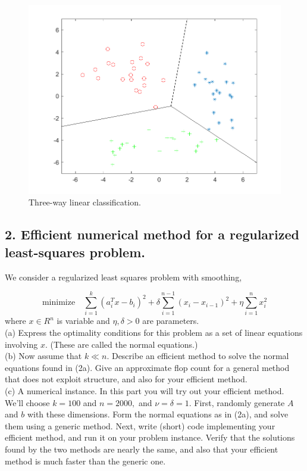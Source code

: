 \documentclass{article}
\begin{document}
\begin{figure}[H]
	\includegraphics[width=\linewidth]
	{additional_1_fig_1.png}
	\caption{Three-way linear classification.}
\end{figure}


\subsection*{2. Efficient numerical method for a regularized least-squares problem.}

We consider a regularized least squares problem with smoothing,

$$
\text{minimize} \quad \sum_{i = 1}^{k} (a_i^T x - b_i)^2 
+ \delta \sum_{i=1}^{n-1}(x_i - x_{i-1})^2 + 
\eta \sum_{i=1}^n x_i^2
$$
where $x \in R^n$ is variable and $\eta, \delta > 0$ are parameters. \\

(a) Express the optimality conditions for this problem as a set of linear equations involving $x.$ (These are called the normal equations.)\\

(b) Now assume that $k \ll n.$ Describe an efficient method to solve the normal
equations found in (2a). Give an approximate flop count for a general method
that does not exploit structure, and also for your efficient method.\\

(c) A numerical instance. In this part you will try out your efficient method. We’ll
choose $k = 100$ and $n = 2000,$ and $\nu = \delta = 1.$ First, randomly generate $A$ and
$b$ with these dimensions. Form the normal equations as in (2a), and solve them
using a generic method. Next, write (short) code implementing your efficient
method, and run it on your problem instance. Verify that the solutions found by
the two methods are nearly the same, and also that your efficient method is much
faster than the generic one.\\
\end{document}
